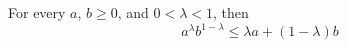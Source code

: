 \documentclass[../../main.tex]{subfiles}
\begin{document}
\begin{wts}
For every $a$, $b\geq0$, and $0<\lambda<1$, then
\[
a^\lambda b^{1-\lambda}\leq\lambda a+(1-\lambda)b
\]
\end{wts}
\end{document}
